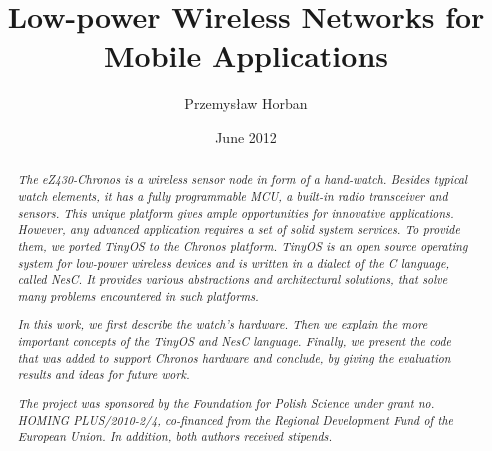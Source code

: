 \documentclass{pracamgr}
\author{Przemysław Horban}
\title{Low-power Wireless Networks for Mobile Applications}
\date{June 2012}
\begin{document}
\maketitle

\begin{abstract}
  \emph{The eZ430-Chronos is a wireless sensor node in form of a hand-watch. Besides typical watch elements, it has a fully programmable MCU, a built-in radio transceiver and sensors. This unique platform gives ample opportunities for innovative applications. However, any advanced application requires a set of solid system services. To provide them, we ported TinyOS to the Chronos platform. TinyOS is an open source operating system for low-power wireless devices and is written in a dialect of the C language, called NesC. It provides various abstractions and architectural solutions, that solve many problems encountered in such platforms.}

\emph{In this work, we first describe the watch's hardware. Then we explain the more important concepts of the TinyOS and NesC language. Finally, we present the code that was added to support Chronos hardware and conclude, by giving the evaluation results and ideas for future work.}

\emph{The project was sponsored by the Foundation for Polish Science under grant no. HOMING PLUS/2010-2/4, co-financed from the Regional Development Fund of the European Union. In addition, both authors received stipends.}
\end{abstract}

\tableofcontents














% 



\appendix






\end{document}
